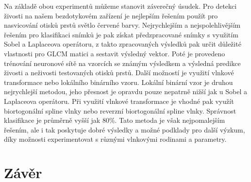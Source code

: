 Na základě obou experimentů můžeme stanovit záverečný úsudek. Pro detekci živosti na našem bezdotykovém zařízení je nejlepším řešením použít pro nasvicování otisků prstů světlo červené barvy. Nejrychlejším a nejspolehlivějším řešením pro klasifikaci snímků je pak získat předzpracované snímky s využitím Sobel a Laplaceova operátoru, z takto zpracovaných výsledků pak určit důležité vlastnosti pro GLCM matici a sestavit výsledný vektor. Poté je provedeno trénování neuronové sítě na vzorcích se známým výsledkem a výsledná predikce živosti a neživosti testovaných otisků prstů. Další možností je využití vlnkové transformace nebo lokálního binárního vzoru. Lokální binární vzor je druhou nejrychlejší metodou, jeho přesnost je opravdu pouze nepatrně nižší jak u Sobel a Laplaceova operátoru. Při využití vlnkové transformace je vhodné pak využít biortogonální spline vlnky nebo reverzní biortogonální spline vlnky. Správnost klasifikace je průměrně vyšší jak 80\%. Tato metoda je však nejpomalejším řešením, ale i tak poskytuje dobré výsledky a možné podklady pro další výzkum, díky možnosti experimentovat s různými vlnkovými rodinami a parametry.






\label{citace}



\chapter{Závěr}
 

\label{zaver}


